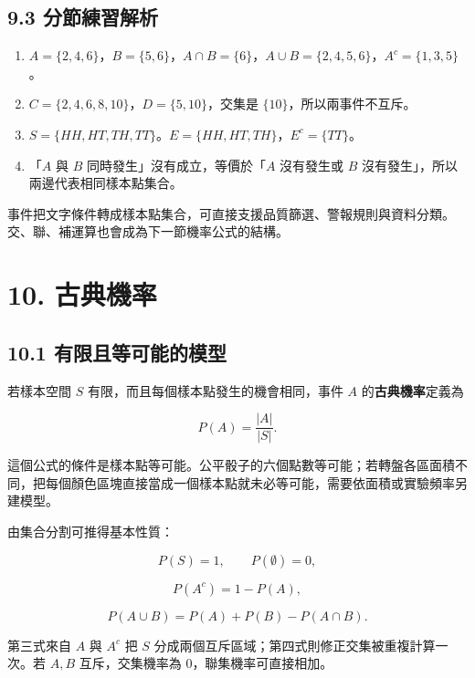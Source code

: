 \documentclass[11pt,a4paper]{article}
\providecommand{\tightlist}{%
  \setlength{\itemsep}{0pt}\setlength{\parskip}{0pt}}
\begin{document}
\subsection{9.3 分節練習解析}\label{ux5206ux7bc0ux7df4ux7fd2ux89e3ux6790-8}

\begin{enumerate}
\def\labelenumi{\arabic{enumi}.}
\tightlist
\item
  \(A=\{2,4,6\}\)，\(B=\{5,6\}\)，\(A\cap B=\{6\}\)，\(A\cup B=\{2,4,5,6\}\)，\(A^c=\{1,3,5\}\)。
\item
  \(C=\{2,4,6,8,10\}\)，\(D=\{5,10\}\)，交集是 \(\{10\}\)，所以兩事件不互斥。
\item
  \(S=\{HH,HT,TH,TT\}\)。\(E=\{HH,HT,TH\}\)，\(E^c=\{TT\}\)。
\item
  「\(A\) 與 \(B\) 同時發生」沒有成立，等價於「\(A\) 沒有發生或 \(B\) 沒有發生」，所以兩邊代表相同樣本點集合。
\end{enumerate}

事件把文字條件轉成樣本點集合，可直接支援品質篩選、警報規則與資料分類。交、聯、補運算也會成為下一節機率公式的結構。

\section{10. 古典機率}\label{ux53e4ux5178ux6a5fux7387}

\subsection{10.1 有限且等可能的模型}\label{ux6709ux9650ux4e14ux7b49ux53efux80fdux7684ux6a21ux578b}

若樣本空間 \(S\) 有限，而且每個樣本點發生的機會相同，事件 \(A\) 的\textbf{古典機率}定義為

\[
\boxed{P(A)=\frac{|A|}{|S|}}.
\]

這個公式的條件是樣本點等可能。公平骰子的六個點數等可能；若轉盤各區面積不同，把每個顏色區塊直接當成一個樣本點就未必等可能，需要依面積或實驗頻率另建模型。

由集合分割可推得基本性質：

\[
P(S)=1,\qquad P(\emptyset)=0,
\]

\[
\boxed{P(A^c)=1-P(A)},
\]

\[
\boxed{P(A\cup B)=P(A)+P(B)-P(A\cap B)}.
\]

第三式來自 \(A\) 與 \(A^c\) 把 \(S\) 分成兩個互斥區域；第四式則修正交集被重複計算一次。若 \(A,B\) 互斥，交集機率為 \(0\)，聯集機率可直接相加。
\end{document}
